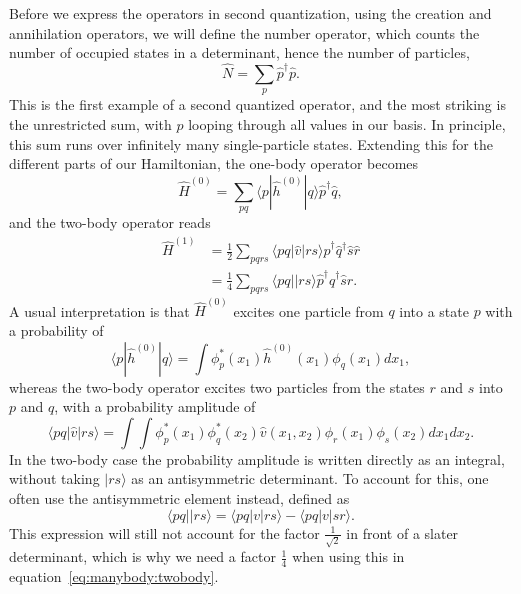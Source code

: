 Before we express the operators in second quantization, using the creation and annihilation operators, we will define the number operator, which counts the number of occupied states in a determinant, hence the number of particles,
\begin{equation}
\label{eq:manybody:numberoperator}
\hat{N} = \sum_p \hat{p}^{\dagger} \hat{p} .
\end{equation}
This is the first example of a second quantized operator, and the most striking is the unrestricted sum, with $p$ looping through all values in our basis. In principle, this sum runs over infinitely many single-particle states.
Extending this for the different parts of our Hamiltonian, the one-body operator becomes
\begin{equation}
\hat{H}^{(0)} = \sum_{pq} \langle p| \hat{h}^{(0)} |q\rangle \hat{p}^{\dagger} \hat{q},
\end{equation}
and the two-body operator reads
\begin{equation}
\label{eq:manybody:twobody}
\begin{split}
\hat{H}^{(1)} &= \frac{1}{2} \sum_{pqrs} \langle pq | \hat{v} | rs \rangle 
\hat{p}^{\dagger} \hat{q}^{\dagger} \hat{s}\hat{r} \\
&= \frac{1}{4} \sum_{pqrs} \langle pq ||rs \rangle \hat{p}^{\dagger}
\hat{q}^{\dagger} \hat{s} \hat{r} .
\end{split}
\end{equation}
A usual interpretation is that $\hat{H}^{(0)}$ excites one particle from $q$ into a state
$p$ with a probability of
\begin{equation}
\langle p| \hat{h}^{(0)} |q\rangle = \int \phi_p^{*}(x_1) \hat{h}^{(0)}(x_1)
\phi_q(x_1) dx_1 ,
\end{equation}
whereas the two-body operator excites two particles from the states $r$ and $s$ into
$p$ and $q$, with a probability amplitude of
\begin{equation}
\langle pq | \hat{v} | rs \rangle =
\int \int \phi_p^{*}(x_1)\phi_q^{*}(x_2) \hat{v}(x_1,x_2) \phi_r(x_1)
\phi_s(x_2) dx_1 dx_2 .
\end{equation}
In the two-body case the probability amplitude is written directly as an integral,
without taking $|rs\rangle$ as an antisymmetric determinant.
To account for this, one often use the antisymmetric element instead, defined as
\begin{equation}
\label{eq:manybody:v_elem}
\langle pq | | rs \rangle = \langle pq |v| rs \rangle - \langle pq |v| sr
\rangle .
\end{equation}
This expression will still not account for the factor $\frac{1}{\sqrt{2}}$ in
front of a slater determinant, which is why we need a factor $\frac{1}{4}$ when
using this in equation~\eqref{eq:manybody:twobody}.

